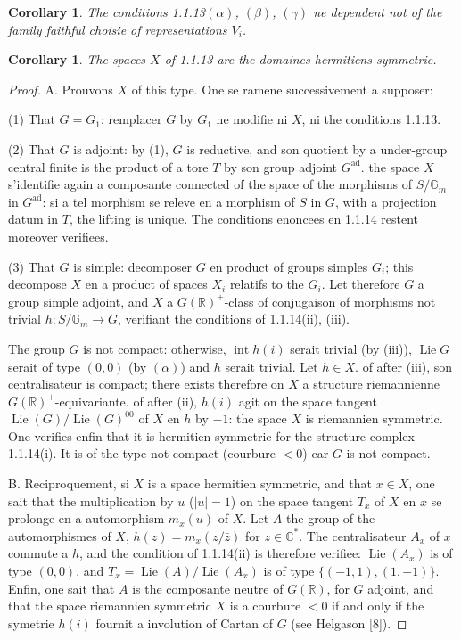\documentclass[12pt,a4paper]{article}
\theoremstyle{plain}
\newtheorem{corollary}[theorem]{Corollary}
\theoremstyle{definition}
\theoremstyle{remark}
\DeclareMathOperator{\Lie}{Lie}
\DeclareMathOperator{\Int}{int}
\newcommand{\RR}{\mathbb{R}}
\newcommand{\CC}{\mathbb{C}}
\newcommand{\Gm}{\mathbb{G}}
\begin{document}
\begin{corollary}
The conditions 1.1.13$(\alpha)$, $(\beta)$, $(\gamma)$ ne dependent not of the family faithful choisie of representations $V_i$.
\end{corollary}

\begin{corollary}
The spaces $X$ of \textup{1.1.13} are the domaines hermitiens symmetric.
\end{corollary}

\begin{proof}
A. Prouvons $X$ of this type. One se ramene successivement a supposer:

(1) That $G = G_1$: remplacer $G$ by $G_1$ ne modifie ni $X$, ni the conditions 1.1.13.

(2) That $G$ is adjoint: by (1), $G$ is reductive, and son quotient by a under-group central finite is the product of a tore $T$ by son group adjoint $G^{\text{ad}}$. the space $X$ s'identifie again a composante connected of the space of the morphisms of $S/\Gm_m$ in $G^{\text{ad}}$: si a tel morphism se releve en a morphism of $S$ in $G$, with a projection datum in $T$, the lifting is unique. The conditions enoncees en 1.1.14 restent moreover verifiees.

(3) That $G$ is simple: decomposer $G$ en product of groups simples $G_i$; this decompose $X$ en a product of spaces $X_i$ relatifs to the $G_i$. Let therefore $G$ a group simple adjoint, and $X$ a $G(\RR)^+$-class of conjugaison of morphisms not trivial $h:S/\Gm_m \to G$, verifiant the conditions of 1.1.14(ii), (iii).

The group $G$ is not compact: otherwise, $\Int h(i)$ serait trivial (by (iii)), $\Lie G$ serait of type $(0,0)$ (by $(\alpha)$) and $h$ serait trivial. Let $h \in X$. of after (iii), son centralisateur is compact; there exists therefore on $X$ a structure riemannienne $G(\RR)^+$-equivariante. of after (ii), $h(i)$ agit on the space tangent $\Lie(G)/\Lie(G)^{00}$ of $X$ en $h$ by $-1$: the space $X$ is riemannien symmetric. One verifies enfin that it is hermitien symmetric for the structure complex 1.1.14(i). It is of the type not compact (courbure $< 0$) car $G$ is not compact.

B. Reciproquement, si $X$ is a space hermitien symmetric, and that $x \in X$, one sait that the multiplication by $u$ ($|u|=1$) on the space tangent $T_x$ of $X$ en $x$ se prolonge en a automorphism $m_x(u)$ of $X$. Let $A$ the group of the automorphismes of $X$, $h(z) = m_x(z/\bar{z})$ for $z \in \CC^*$. The centralisateur $A_x$ of $x$ commute a $h$, and the condition of 1.1.14(ii) is therefore verifiee: $\Lie(A_x)$ is of type $(0,0)$, and $T_x = \Lie(A)/\Lie(A_x)$ is of type $\{(-1,1),(1,-1)\}$. Enfin, one sait that $A$ is the composante neutre of $G(\RR)$, for $G$ adjoint, and that the space riemannien symmetric $X$ is a courbure $< 0$ if and only if the symetrie $h(i)$ fournit a involution of Cartan of $G$ (see Helgason [8]).
\end{proof}
\end{document}
